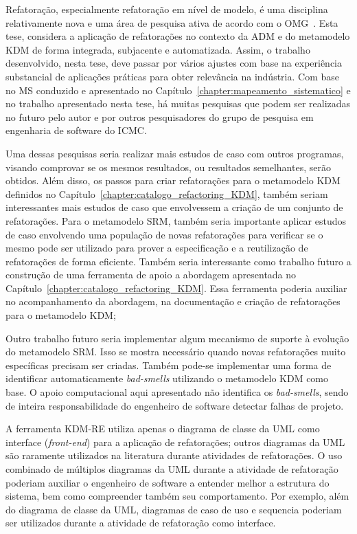 Refatoração, especialmente refatoração em nível de modelo, é uma disciplina relativamente nova e uma área de pesquisa ativa de acordo com o OMG~\cite{OMG_OMG, ADM:OMG}. Esta tese, considera a aplicação de refatorações no contexto da ADM e do metamodelo KDM de forma integrada, subjacente e automatizada. Assim, o trabalho desenvolvido, nesta tese, deve passar por vários ajustes com base na experiência substancial de aplicações práticas para obter relevância na indústria. Com base no MS conduzido e apresentado no Capítulo~\ref{chapter:mapeamento_sistematico} e no trabalho apresentado nesta tese, há muitas pesquisas que podem ser realizadas no futuro pelo autor e por outros pesquisadores do grupo de pesquisa em engenharia de software do ICMC.

Uma dessas pesquisas seria realizar mais estudos de caso com outros programas, visando comprovar se os mesmos resultados, ou resultados semelhantes, serão obtidos. Além disso, os passos para criar refatorações para o metamodelo KDM definidos no Capítulo~\ref{chapter:catalogo_refactoring_KDM}, também seriam interessantes mais estudos de caso que envolvessem a criação de um conjunto de refatorações. Para o metamodelo SRM, também seria importante aplicar estudos de caso envolvendo uma população de novas refatorações para verificar se o mesmo pode ser utilizado para prover a especificação e a reutilização de refatorações de forma eficiente. Também seria interessante como trabalho futuro a construção de uma ferramenta de apoio a abordagem apresentada no Capítulo~\ref{chapter:catalogo_refactoring_KDM}. Essa ferramenta poderia auxiliar no acompanhamento da abordagem, na documentação e criação de refatorações para o metamodelo KDM;

Outro trabalho futuro seria implementar algum mecanismo de suporte à evolução do metamodelo SRM. Isso se mostra necessário quando novas refatorações muito específicas precisam ser criadas. Também pode-se implementar uma forma de identificar automaticamente \textit{bad-smells} utilizando o metamodelo KDM como base. O apoio computacional aqui apresentado não identifica os \textit{bad-smells}, sendo de inteira responsabilidade do engenheiro de software detectar falhas de projeto.


A ferramenta KDM-RE utiliza apenas o diagrama de classe da UML como interface (\textit{front-end}) para a aplicação de refatorações; outros diagramas da UML são raramente utilizados na literatura durante atividades de refatorações. O uso combinado de múltiplos diagramas da UML durante a atividade de refatoração poderiam auxiliar o engenheiro de software a entender melhor a estrutura do sistema, bem como compreender também seu comportamento. Por exemplo, além do diagrama de classe da UML, diagramas de caso de uso e sequencia poderiam ser utilizados durante a atividade de refatoração como interface. 
